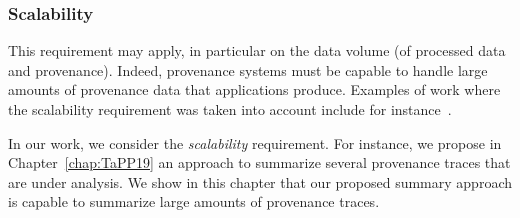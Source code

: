 %
\subsubsection{Scalability}
This requirement may apply, in particular on the data volume (of processed data and provenance). Indeed, provenance systems must be capable to handle large amounts of provenance data that applications produce.
Examples of work where the scalability requirement was taken into account include for instance~\cite{Interlandi2015,Muniswamy-Reddy2010,Akoush2013}.

In our work, we consider the \emph{scalability} requirement.
For instance, 
we propose in Chapter~\ref{chap:TaPP19} an approach to summarize several provenance traces that are under analysis. We show in this chapter that our proposed summary approach is capable to summarize large amounts of provenance traces.
